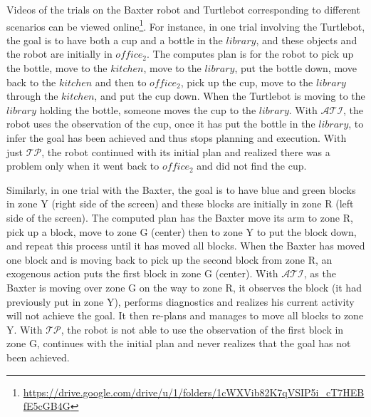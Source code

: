 \documentclass[letterpaper, 10 pt, conference]{article}  %
\begin{document}
Videos of the trials on the Baxter robot and Turtlebot corresponding
to different scenarios can be viewed
online\footnote{\url{https://drive.google.com/drive/u/1/folders/1cWXVib82K7qVSIP5i_cT7HEBfE5cGB4G}}.
For instance, in one trial involving the Turtlebot, the goal is to
have both a cup and a bottle in the $library$, and these objects and
the robot are initially in $office_2$. The computes plan is for the
robot to pick up the bottle, move to the $kitchen$, move to the
$library$, put the bottle down, move back to the $kitchen$ and then to
$office_2$, pick up the cup, move to the $library$ through the
$kitchen$, and put the cup down. When the Turtlebot is moving to the
$library$ holding the bottle, someone moves the cup to the $library$.
With $\mathcal{ATI}$, the robot uses the observation of the cup, once
it has put the bottle in the $library$, to infer the goal has been
achieved and thus stops planning and execution. With just
$\mathcal{TP}$, the robot continued with its initial plan and realized
there was a problem only when it went back to $office_2$ and did not
find the cup.

Similarly, in one trial with the Baxter, the goal is to have blue and
green blocks in zone Y (right side of the screen) and these blocks are
initially in zone R (left side of the screen). The computed plan has
the Baxter move its arm to zone R, pick up a block, move to zone G
(center) then to zone Y to put the block down, and repeat this process
until it has moved all blocks. When the Baxter has moved one block and
is moving back to pick up the second block from zone R, an exogenous
action puts the first block in zone G (center). With $\mathcal{ATI}$,
as the Baxter is moving over zone G on the way to zone R, it observes
the block (it had previously put in zone Y), performs diagnostics and
realizes his current activity will not achieve the goal. It then
re-plans and manages to move all blocks to zone Y. With
$\mathcal{TP}$, the robot is not able to use the observation of the
first block in zone G, continues with the initial plan and never
realizes that the goal has not been achieved.



\end{document}
